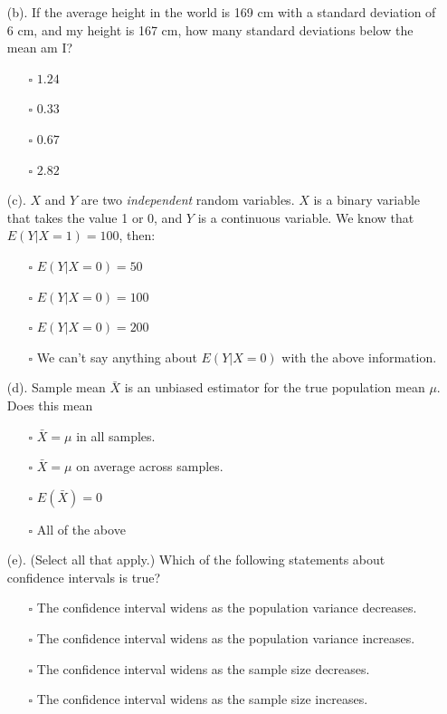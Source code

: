 \documentclass{./../../Latex/tests}
\begin{document}
\begin{enumerate}
\item[(b).] If the average height in the world is 169 cm with a standard deviation of 6 cm, and my height is 167 cm, how many standard deviations below the mean am I?
\begin{enumerate}
\item[$\square$] $1.24$
\item[$\square$] $0.33$
\item[$\square$] $0.67$
\item[$\square$] $2.82$ \\
\end{enumerate}
\newpage
\item[(c).] $X$ and $Y$ are two \textit{independent} random variables. $X$ is a binary variable that takes the value 1 or 0, and $Y$ is a continuous variable. We know that $E(Y|X=1) = 100$, then:
\begin{enumerate}
\item[$\square$] $E(Y|X=0) = 50$
\item[$\square$] $E(Y|X=0) = 100$
\item[$\square$] $E(Y|X=0) = 200$
\item[$\square$] We can't say anything about $E(Y|X=0)$ with the above information. \\
\end{enumerate}
\item[(d).] Sample mean $\bar{X}$ is an unbiased estimator for the true population mean $\mu$. Does this mean
\begin{enumerate}
	\item[$\square$] $\bar{X}=\mu$ in all samples.
	\item[$\square$] $\bar{X}=\mu$ on average across samples.
	\item[$\square$] $E(\bar{X})=0$
	\item[$\square$] All of the above \\
\end{enumerate}
\item[(e).] (Select all that apply.) Which of the following statements about confidence intervals is true?
\begin{enumerate}
	\item[$\square$] The confidence interval widens as the population variance decreases.
	\item[$\square$] The confidence interval widens as the population variance increases.
	\item[$\square$] The confidence interval widens as the sample size decreases.
	\item[$\square$] The confidence interval widens as the sample size increases. \\
\end{enumerate}
\end{enumerate}
\end{document}
